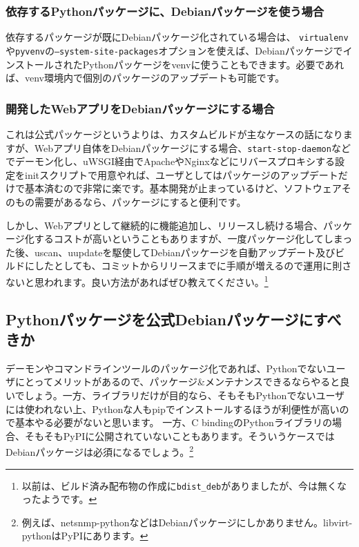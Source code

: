 \documentclass[mingoth,a4paper]{jsarticle}
\begin{document}
\subsubsection{依存するPythonパッケージに、Debianパッケージを使う場合}

依存するパッケージが既にDebianパッケージ化されている場合は、
\texttt{virtualenv}や\texttt{pyvenv}の\texttt{--system-site-packages}オプションを使えば、DebianパッケージでインストールされたPythonパッケージをvenvに使うこともできます。必要であれば、venv環境内で個別のパッケージのアップデートも可能です。

\subsubsection{開発したWebアプリをDebianパッケージにする場合}

これは公式パッケージというよりは、カスタムビルドが主なケースの話になりますが、Webアプリ自体をDebianパッケージにする場合、\texttt{start-stop-daemon}などでデーモン化し、uWSGI経由でApacheやNginxなどにリバースプロキシする設定をinitスクリプトで用意やれば、ユーザとしてはパッケージのアップデートだけで基本済むので非常に楽です。基本開発が止まっているけど、ソフトウェアそのもの需要があるなら、パッケージにすると便利です。

しかし、Webアプリとして継続的に機能追加し、リリースし続ける場合、パッケージ化するコストが高いということもありますが、一度パッケージ化してしまった後、uscan、uupdateを駆使してDebianパッケージを自動アップデート及びビルドにしたとしても、コミットからリリースまでに手順が増えるので運用に則さないと思われます。良い方法があればぜひ教えてください。\footnote{以前は、ビルド済み配布物の作成に\texttt{bdist\_deb}がありましたが、今は無くなったようです。}

\subsection{Pythonパッケージを公式Debianパッケージにすべきか}
デーモンやコマンドラインツールのパッケージ化であれば、Pythonでないユーザにとってメリットがあるので、パッケージ\&メンテナンスできるならやると良いでしょう。一方、ライブラリだけが目的なら、そもそもPythonでないユーザには使われない上、Pythonな人もpipでインストールするほうが利便性が高いので基本やる必要がないと思います。
一方、C bindingのPythonライブラリの場合、そもそもPyPIに公開されていないこともあります。そういうケースではDebianパッケージは必須になるでしょう。\footnote{例えば、netsnmp-pythonなどはDebianパッケージにしかありません。libvirt-pythonはPyPIにあります。}
\end{document}
